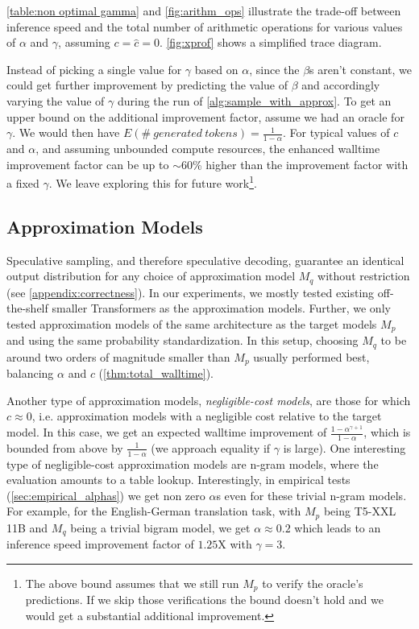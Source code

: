 \ref{table:non optimal gamma} and \ref{fig:arithm_ops} illustrate the trade-off between inference speed and the total number of arithmetic operations for various values of $\alpha$ and $\gamma$, assuming $c = \hat{c} = 0$.
\ref{fig:xprof} shows a simplified trace diagram.

Instead of picking a single value for $\gamma$ based on $\alpha$, since the $\beta$s aren’t constant, we could get further improvement by predicting the value of $\beta$ and accordingly varying the value of $\gamma$ during the run of \ref{alg:sample_with_approx}. To get an upper bound on the additional improvement factor, assume we had an oracle for $\gamma$. We would then have $E(\#\ generated\ tokens) = \frac{1}{1-\alpha}$.
For typical values of $c$ and $\alpha$, and assuming unbounded compute resources, the enhanced walltime improvement factor can be up to $\sim$60\% higher than the improvement factor with a fixed $\gamma$. We leave exploring this for future work\footnote{The above bound assumes that we still run $M_p$ to verify the oracle's predictions. If we skip those verifications the bound doesn't hold and we would get a substantial additional improvement.}.

\subsection{Approximation Models}
\label{sec:approximation_models}
Speculative sampling, and therefore speculative decoding, guarantee an identical output distribution for any choice of approximation model $M_q$ without restriction (see \ref{appendix:correctness}).
In our experiments, we mostly tested existing off-the-shelf smaller Transformers as the approximation models. Further, we only tested approximation models of the same architecture as the target models $M_p$ and using the same probability standardization. In this setup, choosing $M_q$ to be around two orders of magnitude smaller than $M_p$ usually performed best, balancing $\alpha$ and $c$ (\ref{thm:total_walltime}).

Another type of approximation models, \emph{negligible-cost models}, are those for which $c \approx 0$, i.e. approximation models with a negligible cost relative to the target model. In this case, we get an expected walltime improvement of $\frac{1 - \alpha^{\gamma + 1}}{1 - \alpha}$, which is bounded from above by $\frac{1}{1 - \alpha}$ (we approach equality if $\gamma$ is large). One interesting type of negligible-cost approximation models are n-gram models, where the evaluation amounts to a table lookup. Interestingly, in empirical tests (\ref{sec:empirical_alphas}) we get non zero $\alpha$s even for these trivial n-gram models. For example, for the English-German translation task, with $M_p$ being T5-XXL 11B and $M_q$ being a trivial bigram model, we get $\alpha \approx 0.2$ which leads to an inference speed improvement factor of $1.25$X with $\gamma=3$.

